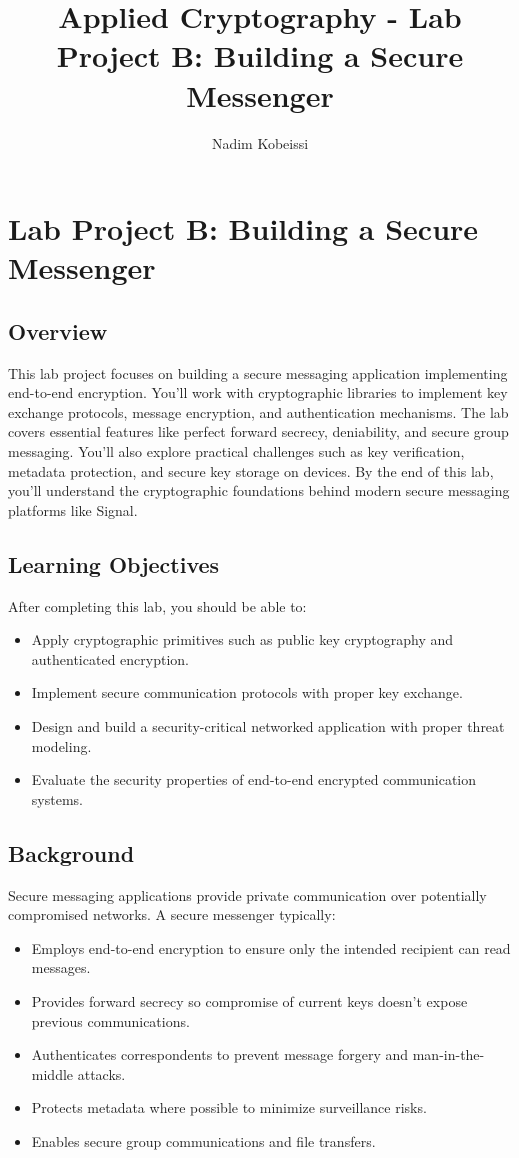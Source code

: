 \documentclass[10pt,a4paper,american]{article}
\title{Applied Cryptography - Lab Project B: Building a Secure Messenger}
\author{Nadim Kobeissi}
\begin{document}
\classhandoutheader
\section*{Lab Project B: Building a Secure Messenger}

\subsection*{Overview}
This lab project focuses on building a secure messaging application implementing end-to-end encryption. You'll work with cryptographic libraries to implement key exchange protocols, message encryption, and authentication mechanisms. The lab covers essential features like perfect forward secrecy, deniability, and secure group messaging. You'll also explore practical challenges such as key verification, metadata protection, and secure key storage on devices. By the end of this lab, you'll understand the cryptographic foundations behind modern secure messaging platforms like Signal.

\subsection*{Learning Objectives}
After completing this lab, you should be able to:
\begin{itemize}
	\item Apply cryptographic primitives such as public key cryptography and authenticated encryption.
	\item Implement secure communication protocols with proper key exchange.
	\item Design and build a security-critical networked application with proper threat modeling.
	\item Evaluate the security properties of end-to-end encrypted communication systems.
\end{itemize}

\subsection*{Background}
Secure messaging applications provide private communication over potentially compromised networks. A secure messenger typically:
\begin{itemize}
	\item Employs end-to-end encryption to ensure only the intended recipient can read messages.
	\item Provides forward secrecy so compromise of current keys doesn't expose previous communications.
	\item Authenticates correspondents to prevent message forgery and man-in-the-middle attacks.
	\item Protects metadata where possible to minimize surveillance risks.
	\item Enables secure group communications and file transfers.
\end{itemize}
\end{document}
